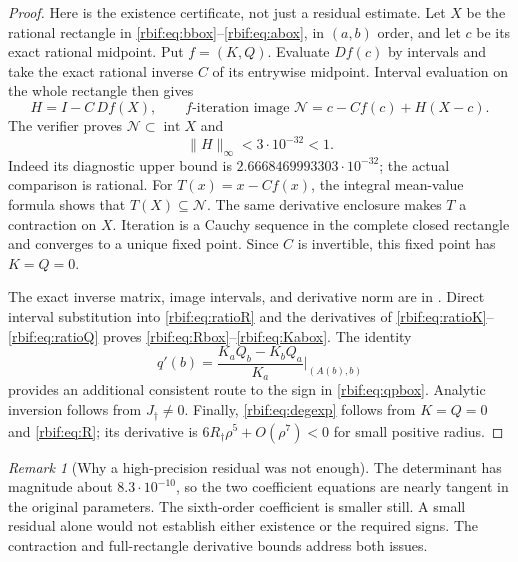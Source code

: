 \documentclass[11pt,a4paper]{article}
\theoremstyle{definition}\newtheorem{definition}[theorem]{Definition}
\theoremstyle{remark}\newtheorem{remark}[theorem]{Remark}
\newcommand{\rbrr}{R_\dagger}
\numberwithin{equation}{section}
\begin{document}
\begin{proof}
Here is the existence certificate, not just a residual estimate.
Let $X$ be the rational rectangle in
\eqref{rbif:eq:bbox}--\eqref{rbif:eq:abox}, in $(a,b)$ order, and
let $c$ be its exact rational midpoint. Put $f=(K,Q)$.
Evaluate $Df(c)$ by intervals and take the exact rational inverse $C$
of its entrywise midpoint. Interval evaluation on the whole rectangle
then gives
\[
 H=I-C\,Df(X),\qquad
 f\text{-iteration image }\mathcal N
 =c-Cf(c)+H(X-c).
\]
The verifier proves $\mathcal N\subset\operatorname{int}X$ and
\begin{equation}
 \|H\|_\infty<3\cdot10^{-32}<1.
 \label{rbif:eq:contraction}
\end{equation}
Indeed its diagnostic upper bound is
$2.6668469993303\cdot10^{-32}$; the actual comparison is rational.
For $T(x)=x-Cf(x)$, the integral mean-value formula shows that
$T(X)\subseteq\mathcal N$. The same derivative enclosure makes $T$
a contraction on $X$. Iteration is a Cauchy sequence in the complete
closed rectangle and converges to a unique fixed point. Since $C$ is
invertible, this fixed point has $K=Q=0$.

The exact inverse matrix, image intervals, and derivative norm are in
. Direct interval substitution into
\eqref{rbif:eq:ratioR} and the derivatives of
\eqref{rbif:eq:ratioK}--\eqref{rbif:eq:ratioQ} proves
\eqref{rbif:eq:Rbox}--\eqref{rbif:eq:Kabox}. The identity
\[
 q'(b)=\frac{K_aQ_b-K_bQ_a}{K_a}\bigg|_{(A(b),b)}
\]
provides an additional consistent route to the sign in
\eqref{rbif:eq:qpbox}. Analytic inversion follows from
$J_\dagger\ne0$. Finally, \eqref{rbif:eq:degexp} follows from
$K=Q=0$ and \eqref{rbif:eq:R}; its derivative is
$6\rbrr\rho^5+O(\rho^7)<0$ for small positive radius.
\end{proof}

\begin{remark}[Why a high-precision residual was not enough]
The determinant has magnitude about $8.3\cdot10^{-10}$, so the two
coefficient equations are nearly tangent in the original parameters.
The sixth-order coefficient is smaller still. A small residual alone
would not establish either existence or the required signs. The
contraction and full-rectangle derivative bounds address both issues.
\end{remark}
\end{document}
